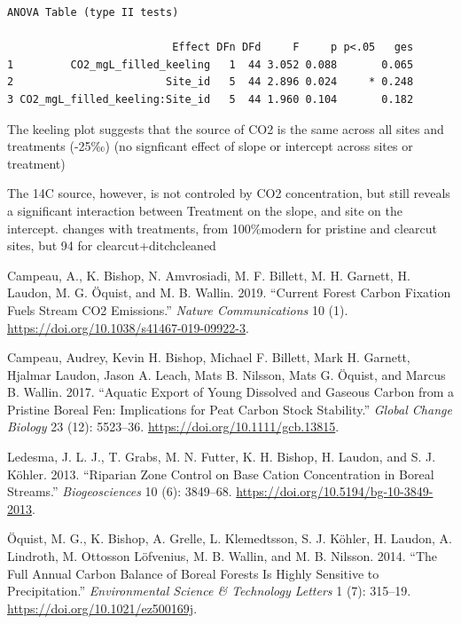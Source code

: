 \documentclass[
  letterpaper,
  DIV=11,
  numbers=noendperiod]{scrartcl}
\newlength{\cslhangindent}
\newenvironment{CSLReferences}[2] %
 {\begin{list}{}{%
  \setlength{\itemindent}{0pt}
  \setlength{\leftmargin}{0pt}
  \setlength{\parsep}{0pt}
  \ifodd #1
   \setlength{\leftmargin}{\cslhangindent}
   \setlength{\itemindent}{-1\cslhangindent}
  \fi
  \setlength{\itemsep}{#2\baselineskip}}}
 {\end{list}}
\begin{document}
\begin{verbatim}
ANOVA Table (type II tests)

                          Effect DFn DFd     F     p p<.05   ges
1         CO2_mgL_filled_keeling   1  44 3.052 0.088       0.065
2                        Site_id   5  44 2.896 0.024     * 0.248
3 CO2_mgL_filled_keeling:Site_id   5  44 1.960 0.104       0.182
\end{verbatim}

\begin{tcolorbox}[enhanced jigsaw, opacitybacktitle=0.6, opacityback=0, arc=.35mm, left=2mm, toprule=.15mm, colback=white, coltitle=black, breakable, rightrule=.15mm, colbacktitle=quarto-callout-note-color!10!white, title=\textcolor{quarto-callout-note-color}{\faInfo}\hspace{0.5em}{Interpretation}, colframe=quarto-callout-note-color-frame, toptitle=1mm, bottomrule=.15mm, bottomtitle=1mm, titlerule=0mm, leftrule=.75mm]

The keeling plot suggests that the source of CO2 is the same across all
sites and treatments (-25‰) (no signficant effect of slope or intercept
across sites or treatment)

The 14C source, however, is not controled by CO2 concentration, but
still reveals a significant interaction between Treatment on the slope,
and site on the intercept. changes with treatments, from 100\%modern for
pristine and clearcut sites, but 94 for clearcut+ditchcleaned

\end{tcolorbox}

\label{refs}
\begin{CSLReferences}{1}{0}
Campeau, A., K. Bishop, N. Amvrosiadi, M. F. Billett, M. H. Garnett, H.
Laudon, M. G. Öquist, and M. B. Wallin. 2019. {``Current Forest Carbon
Fixation Fuels Stream CO2 Emissions.''} \emph{Nature Communications} 10
(1). \url{https://doi.org/10.1038/s41467-019-09922-3}.

Campeau, Audrey, Kevin H. Bishop, Michael F. Billett, Mark H. Garnett,
Hjalmar Laudon, Jason A. Leach, Mats B. Nilsson, Mats G. Öquist, and
Marcus B. Wallin. 2017. {``Aquatic Export of Young Dissolved and Gaseous
Carbon from a Pristine Boreal Fen: Implications for Peat Carbon Stock
Stability.''} \emph{Global Change Biology} 23 (12): 5523--36.
\url{https://doi.org/10.1111/gcb.13815}.

Ledesma, J. L. J., T. Grabs, M. N. Futter, K. H. Bishop, H. Laudon, and
S. J. Köhler. 2013. {``Riparian Zone Control on Base Cation
Concentration in Boreal Streams.''} \emph{Biogeosciences} 10 (6):
3849--68. \url{https://doi.org/10.5194/bg-10-3849-2013}.

Öquist, M. G., K. Bishop, A. Grelle, L. Klemedtsson, S. J. Köhler, H.
Laudon, A. Lindroth, M. Ottosson Löfvenius, M. B. Wallin, and M. B.
Nilsson. 2014. {``The Full Annual Carbon Balance of Boreal Forests Is
Highly Sensitive to Precipitation.''} \emph{Environmental Science \&
Technology Letters} 1 (7): 315--19.
\url{https://doi.org/10.1021/ez500169j}.

\end{CSLReferences}
\end{document}
